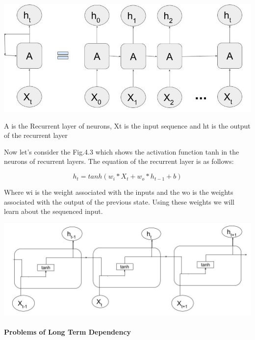 				\begin{center}
				\includegraphics[width=\linewidth]{figures/An-unrolled-recurrent-neural-network.jpg}	
				\label{fig: Unfolded Recurrent layer}
				\end{center}

A is the Recurrent layer of neurons, Xt is the input sequence and ht is the output of the recurrent layer

Now let’s consider the Fig.4.3 which shows the activation function tanh in the neurons of recurrent layers. The equation of the recurrent layer is as follows:

\begin{equation}
	h_{t} = tanh (w_{i} * X_{t} + w_{o} * h_{t-1} + b)
\end{equation}


Where wi is the weight associated with the inputs and the wo is the weights associated with the output of the previous state. Using these weights we will learn about the sequenced input.

				\begin{center}
				\includegraphics[width=\linewidth]{figures/The-repeating-module-in-a-standard-RNN.jpg}	
				\label{fig: Unfolded Recurrent layer with activation function}
				\end{center}


\paragraph{Problems of Long Term Dependency}

